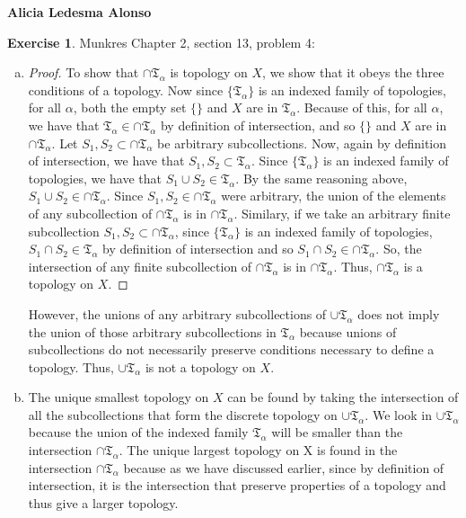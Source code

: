 \documentclass[12pt]{article}
\theoremstyle{definition}
\newtheorem{exercise}{Exercise}
\begin{document}
\bfseries{Alicia Ledesma Alonso}

\begin{exercise} Munkres Chapter 2, section 13, problem 4: 
\begin{enumerate}[(a)]
	\item \begin{proof}
		To show that $\cap{\mathfrak{T}_\alpha}$ is topology on $X$, we show that it obeys the three conditions of a topology. Now since $\{\mathfrak{T}_\alpha\}$ is an indexed family of topologies, for all $\alpha$, both the empty set $\{\}$ and $X$ are in $\mathfrak{T}_\alpha$. Because of this, for all $\alpha$, we have that $\mathfrak{T}_\alpha \in\cap\mathfrak{T}_\alpha$ by definition of intersection, and so $\{\}$ and $X$ are in $\cap\mathfrak{T}_\alpha$. Let $S_1,S_2\subset\cap{\mathfrak{T}_\alpha}$ be arbitrary subcollections. Now, again by definition of intersection, we have that $S_1,S_2\subset\mathfrak{T}_\alpha$. Since $\{\mathfrak{T}_\alpha\}$ is an indexed family of topologies, we have that $S_1\cup S_2 \in \mathfrak{T}_\alpha$. By the same reasoning above, $S_1\cup S_2\in \cap\mathfrak{T}_\alpha$. Since $S_1,S_2\in \cap\mathfrak{T}_\alpha$ were arbitrary, the union of the elements of any subcollection of $\cap\mathfrak{T}_\alpha$ is in $\cap\mathfrak{T}_\alpha$. Similary, if we take an arbitrary finite subcollection $S_1,S_2\subset\cap{\mathfrak{T}_\alpha}$, since $\{\mathfrak{T}_\alpha\}$ is an indexed family of topologies, $S_1\cap S_2\in \mathfrak{T}_\alpha$ by definition of intersection and so $S_1\cap S_2\in \cap\mathfrak{T}_\alpha$. So, the intersection of any finite subcollection of $\cap\mathfrak{T}_\alpha$ is in $\cap\mathfrak{T}_\alpha$. Thus, $\cap\mathfrak{T}_\alpha$ is a topology on $X$. 
	\end{proof}
	However, the unions of any arbitrary subcollections of $\cup\mathfrak{T}_\alpha$ does not imply the union of those arbitrary subcollections in $\mathfrak{T}_\alpha$ because unions of subcollections do not necessarily preserve conditions necessary to define a topology. Thus, $\cup\mathfrak{T}_\alpha$ is not a topology on $X$.
	\item The unique smallest topology on $X$ can be found by taking the intersection of all
	    the subcollections that form the discrete topology on $\cup\mathfrak{T}_\alpha$. We look in $\cup\mathfrak{T}_\alpha$ because the union of the indexed family $\mathfrak{T}_\alpha$ will be smaller than the intersection $\cap\mathfrak{T}_\alpha$. The unique largest topology on X is found in the intersection $\cap\mathfrak{T}_\alpha$ because as we have discussed earlier, since by definition of intersection, it is the intersection that preserve properties of a topology and thus give a larger topology. 

\end{enumerate}
\end{exercise}
\end{document}
